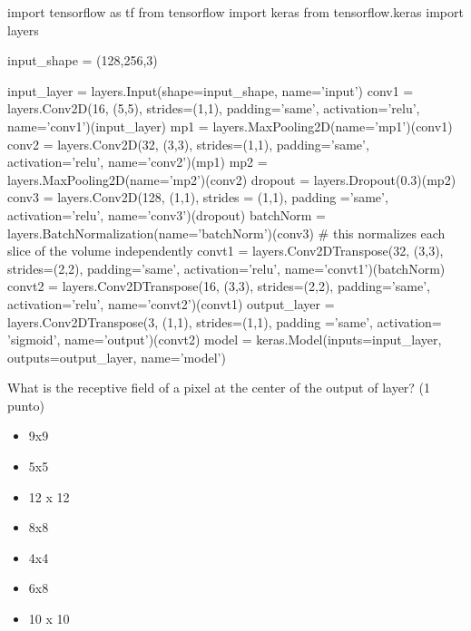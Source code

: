 \begin{python}
import tensorflow as tf
from tensorflow import keras
from tensorflow.keras import layers

input_shape = (128,256,3)

input_layer = layers.Input(shape=input_shape, name='input')
conv1 = layers.Conv2D(16, (5,5), strides=(1,1), padding='same',
        activation='relu', name='conv1')(input_layer)
mp1 = layers.MaxPooling2D(name='mp1')(conv1)
conv2 = layers.Conv2D(32, (3,3), strides=(1,1), padding='same',
        activation='relu', name='conv2')(mp1)
mp2 = layers.MaxPooling2D(name='mp2')(conv2)
dropout = layers.Dropout(0.3)(mp2)
conv3 = layers.Conv2D(128, (1,1), strides = (1,1), padding ='same',
        activation='relu', name='conv3')(dropout)
batchNorm = layers.BatchNormalization(name='batchNorm')(conv3)
        # this normalizes each slice of the volume independently
convt1 = layers.Conv2DTranspose(32, (3,3), strides=(2,2), padding='same',
        activation='relu', name='convt1')(batchNorm)
convt2 = layers.Conv2DTranspose(16, (3,3), strides=(2,2), padding='same',
        activation='relu', name='convt2')(convt1)
output_layer = layers.Conv2DTranspose(3, (1,1), strides=(1,1), padding ='same',
        activation= 'sigmoid', name='output')(convt2)
model = keras.Model(inputs=input_layer, outputs=output_layer, name='model')
\end{python}


What is the receptive field of a pixel at the center of the output of  layer? (1 punto)
\begin{box-sol}
    \begin{itemize}[label=]
        \item 9x9
        \item 5x5
        \item 12 x 12
        \item 8x8
        \item[\ok] 4x4
        \item 6x8
        \item 10 x 10
    \end{itemize}
\end{box-sol}


